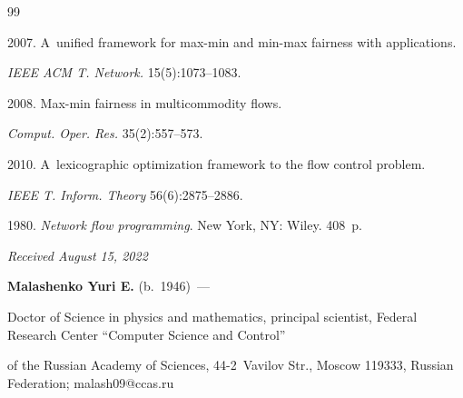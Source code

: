 {{\begin{thebibliography}{99}


 2007. A~unified framework for max-min and min-max fairness with applications. 


\textit{IEEE ACM T. Network.} 15(5):1073--1083. 




 2008. Max-min fairness in multicommodity flows. 


\textit{Comput. Oper. Res.} 35(2):557--573.




 2010. A~lexicographic optimization framework to the flow control problem.


\textit{IEEE T. Inform. Theory} 56(6):2875--2886.




 1980. \textit{Network flow programming}. New York, NY: Wiley. 408~p.


 \end{thebibliography}


} }





\vspace*{-6pt}





\hfill{\small\textit{Received August 15, 2022}} 





\vspace*{-12pt} 





\Contr





\vspace*{-4pt}





\noindent


\textbf{Malashenko Yuri E.} (b.\ 1946)~--- 


Doctor of Science in physics and mathematics, principal scientist, Federal Research Center ``Computer Science and Control'' 


of the Russian Academy of Sciences, 44-2~Vavilov Str., Moscow 119333, Russian Federation; \mbox{malash09@ccas.ru }





